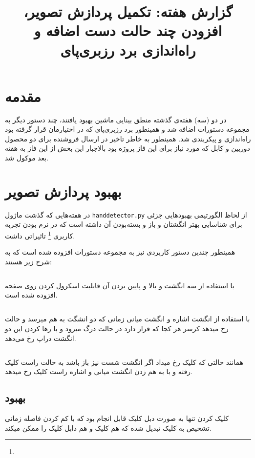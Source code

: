 \documentclass{article}
\title{گزارش هفته: تکمیل پردازش تصویر، افزودن چند حالت دست اضافه و راه‌اندازی برد رزبری‌پای}
\begin{document}
\heading
\header
\allowdisplaybreaks
\tableofcontents
\pagebreak

\section{مقدمه}
در دو (سه) هفته‌ی گذشته منطق بینایی ماشین بهبود یافتند، چند دستور دیگر به مجموعه دستورات اضافه شد
و همینطور برد رزبری‌پای که در اختیارمان قرار گرفته بود راه‌اندازی و پیکربندی شد. همینطور به خاطر تاخیر در ارسال فروشنده برای دو محصول دوربین و کابل  که مورد نیاز برای این فاز پروژه بود بالاجبار این بخش از این فاز به هفته بعد موکول شد.

\section{بهبود پردازش تصویر}
در هفته‌هایی که گذشت ماژول
\verb~handdetector.py~
از لحاظ الگورتیمی بهبود‌هایی جزئی برای شناسایی بهتر انگشتان و باز و بسته‌بودن آن داشته است که در نرم بودن تجربه کاربری \footnote{}
تاثیراتی داشت.

همینطور چندین دستور کاربردی نیز به مجموعه دستورات افزوده شده است که به شرح زیر هستند:

\subsection{}
با استفاده از سه انگشت و بالا و پایین بردن آن قابلیت اسکرول کردن روی صفحه افزوده شده است.


\subsection{}
با استفاده از انگشت اشاره و انگشت میانی زمانی که دو انشگت به هم میرسد و حالت  رخ میدهد کرسر هر کجا که قرار دارد در حالت درگ میرود و با رها کردن این دو انگشت دراپ رخ می‌دهد.


\subsection{}
همانند حالتی که کلیک رخ میداد اگر انگشت شست نیز باز باشد به حالت راست کلیک رفته و با به هم زدن انگشت میانی و اشاره راست کلیک رخ میدهد.


\subsection{بهبود }
کلیک کردن تنها به صورت دبل کلیک قابل انجام بود که با کم کردن فاصله زمانی تشخیص به کلیک تبدیل شده که هم کلیک و هم دابل کلیک را ممکن میکند.
\end{document}
